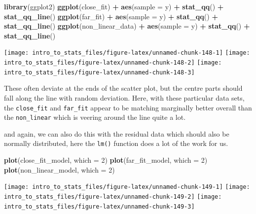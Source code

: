 \documentclass[
]{book}
\newenvironment{Shaded}{\begin{snugshade}}{\end{snugshade}}
\newcommand{\DataTypeTok}[1]{\textcolor[rgb]{0.13,0.29,0.53}{#1}}
\newcommand{\DecValTok}[1]{\textcolor[rgb]{0.00,0.00,0.81}{#1}}
\newcommand{\KeywordTok}[1]{\textcolor[rgb]{0.13,0.29,0.53}{\textbf{#1}}}
\newcommand{\NormalTok}[1]{#1}
\newcommand{\OperatorTok}[1]{\textcolor[rgb]{0.81,0.36,0.00}{\textbf{#1}}}
\newcommand{\StringTok}[1]{\textcolor[rgb]{0.31,0.60,0.02}{#1}}
\begin{document}
\begin{Shaded}
\begin{Highlighting}[]
\KeywordTok{library}\NormalTok{(ggplot2)}
\KeywordTok{ggplot}\NormalTok{(close_fit) }\OperatorTok{+}\StringTok{ }\KeywordTok{aes}\NormalTok{(}\DataTypeTok{sample =}\NormalTok{ y) }\OperatorTok{+}\StringTok{ }\KeywordTok{stat_qq}\NormalTok{() }\OperatorTok{+}\StringTok{ }\KeywordTok{stat_qq_line}\NormalTok{()}
\KeywordTok{ggplot}\NormalTok{(far_fit) }\OperatorTok{+}\StringTok{ }\KeywordTok{aes}\NormalTok{(}\DataTypeTok{sample =}\NormalTok{ y) }\OperatorTok{+}\StringTok{ }\KeywordTok{stat_qq}\NormalTok{() }\OperatorTok{+}\StringTok{ }\KeywordTok{stat_qq_line}\NormalTok{()}
\KeywordTok{ggplot}\NormalTok{(non_linear_data) }\OperatorTok{+}\StringTok{ }\KeywordTok{aes}\NormalTok{(}\DataTypeTok{sample =}\NormalTok{ y) }\OperatorTok{+}\StringTok{ }\KeywordTok{stat_qq}\NormalTok{() }\OperatorTok{+}\StringTok{ }\KeywordTok{stat_qq_line}\NormalTok{()}
\end{Highlighting}
\end{Shaded}

\texttt{[image: intro\_to\_stats\_files/figure-latex/unnamed-chunk-148-1]} \texttt{[image: intro\_to\_stats\_files/figure-latex/unnamed-chunk-148-2]} \texttt{[image: intro\_to\_stats\_files/figure-latex/unnamed-chunk-148-3]}

These often deviate at the ends of the scatter plot, but the centre parts should fall along the line with random deviation. Here, with these particular data sets, the \texttt{close\_fit} and \texttt{far\_fit} appear to be matching marginally better overall than the \texttt{non\_linear} which is veering around the line quite a lot.

and again, we can also do this with the residual data which should also be normally distributed, here the \texttt{lm()} function does a lot of the work for us.

\begin{Shaded}
\begin{Highlighting}[]
\KeywordTok{plot}\NormalTok{(close_fit_model, }\DataTypeTok{which =} \DecValTok{2}\NormalTok{)}
\KeywordTok{plot}\NormalTok{(far_fit_model, }\DataTypeTok{which =} \DecValTok{2}\NormalTok{)}
\KeywordTok{plot}\NormalTok{(non_linear_model, }\DataTypeTok{which =} \DecValTok{2}\NormalTok{)}
\end{Highlighting}
\end{Shaded}

\texttt{[image: intro\_to\_stats\_files/figure-latex/unnamed-chunk-149-1]} \texttt{[image: intro\_to\_stats\_files/figure-latex/unnamed-chunk-149-2]} \texttt{[image: intro\_to\_stats\_files/figure-latex/unnamed-chunk-149-3]}
\end{document}
